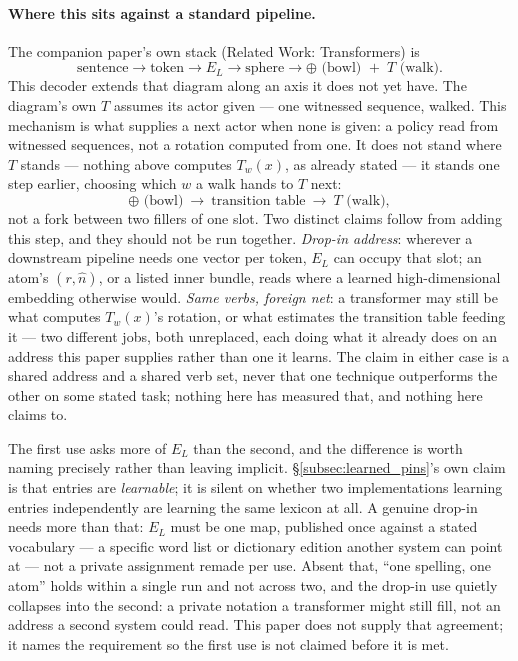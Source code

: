 \documentclass[12pt, a4paper]{article}
\begin{document}
\paragraph{Where this sits against a standard pipeline.} The
companion paper's own stack (Related Work: Transformers) is
\[
\text{sentence}\to\text{token}\to E_L\to\text{sphere}\to
\oplus\text{ (bowl) }+\;T\text{ (walk)}.
\]
This decoder extends that diagram along an axis it does not yet
have. The diagram's own $T$ assumes its actor given --- one
witnessed sequence, walked. This mechanism is what supplies a next
actor when none is given: a policy read from witnessed sequences,
not a rotation computed from one. It does not stand where $T$
stands --- nothing above computes $T_w(x)$, as already stated ---
it stands one step earlier, choosing which $w$ a
walk hands to $T$ next:
\[
\oplus\text{ (bowl)}\ \to\ \text{transition table}\ \to\ T\text{ (walk)},
\]
not a fork between two fillers of one slot. Two distinct claims
follow from adding this step, and they should not be run together.
\emph{Drop-in address}: wherever a downstream pipeline needs one
vector per token, $E_L$ can occupy that slot; an atom's $(r,\hat
n)$, or a listed inner bundle, reads where a learned
high-dimensional embedding otherwise would. \emph{Same verbs,
foreign net}: a transformer may still be what computes $T_w(x)$'s
rotation, or what estimates the transition table feeding it --- two
different jobs, both unreplaced, each doing what it already does on
an address this paper supplies rather than one it learns. The claim
in either case is a shared address and a shared verb set, never that
one technique outperforms the other on some stated task; nothing
here has measured that, and nothing here claims to.

The first use asks more of $E_L$ than the second, and the difference
is worth naming precisely rather than leaving implicit.
\S\ref{subsec:learned_pins}'s own claim is that entries are
\emph{learnable}; it is silent on whether two implementations
learning entries independently are learning the same lexicon at all.
A genuine drop-in needs more than that: $E_L$ must be one map,
published once against a stated vocabulary --- a specific word list
or dictionary edition another system can point at --- not a private
assignment remade per use. Absent that, ``one spelling, one atom''
holds within a single run and not across two, and the drop-in use
quietly collapses into the second: a private notation a transformer
might still fill, not an address a second system could read. This
paper does not supply that agreement; it names the requirement so
the first use is not claimed before it is met.
\end{document}
